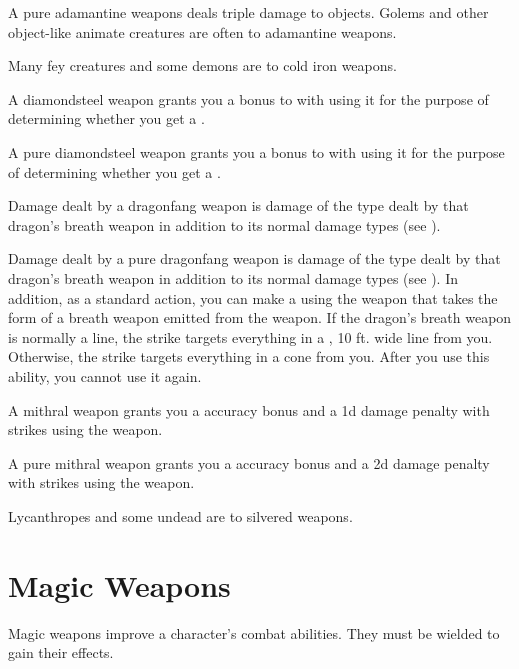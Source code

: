          A pure adamantine weapons deals triple damage to objects.
        Golems and other object-like animate creatures are often  to adamantine weapons.

         Many fey creatures and some demons are  to cold iron weapons.

         A diamondsteel weapon grants you a  bonus to  with  using it for the purpose of determining whether you get a .

         A pure diamondsteel weapon grants you a  bonus to  with  using it for the purpose of determining whether you get a .

         Damage dealt by a dragonfang weapon is damage of the type dealt by that dragon's breath weapon in addition to its normal damage types (see ).

         Damage dealt by a pure dragonfang weapon is damage of the type dealt by that dragon's breath weapon in addition to its normal damage types (see ).
        In addition, as a standard action, you can make a  using the weapon that takes the form of a breath weapon emitted from the weapon.
        If the dragon's breath weapon is normally a line, the strike targets everything in a \arealarge, 10 ft. wide line from you.
        Otherwise, the strike targets everything in a \areamed cone from you.
        After you use this ability, you  cannot use it again.

         A mithral weapon grants you a  accuracy bonus and a \minus1d damage penalty with strikes using the weapon.

         A pure mithral weapon grants you a  accuracy bonus and a \minus2d damage penalty with strikes using the weapon.

         Lycanthropes and some undead are  to silvered weapons.

\newpage
\section{Magic Weapons}
    Magic weapons improve a character's combat abilities.
    They must be wielded to gain their effects.

